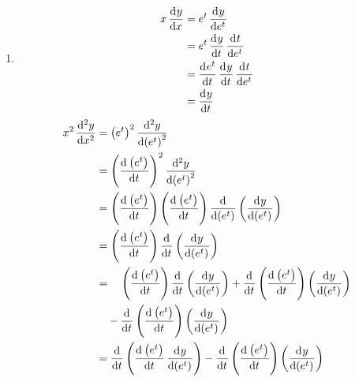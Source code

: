 \documentclass[fleqn, a4paper, 11pt, oneside]{amsart}
\theoremstyle{definition}
\theoremstyle{theorem}
\begin{document}
\begin{solution}
	\begin{enumerate}
		\item
			\begin{align*}
				x \dod{y}{x} & = e^t \dod{y}{{e^t}}                       \\
                                             & = e^t \dod{y}{t} \dod{t}{{e^t}}            \\
                                             & = \dod{{e^t}}{t} \dod{y}{t} \dod{t}{{e^t}} \\
                                             & = \dod{y}{t}
			\end{align*}
			\begin{align*}
				x^2 \dod[2]{y}{x} & = \left( e^t \right)^2 \dod[2]{y}{\left( e^t \right)}                                                                                                                                                   \\
                                                  & = \left( \dod{\left( e^t \right)}{t} \right)^2 \dod[2]{y}{\left( e^t \right)}                                                                                                                           \\
                                                  & = \left( \dod{\left( e^t \right)}{t} \right) \left( \dod{\left( e^t \right)}{t} \right) \dod{}{\left( e^t \right)}\left( \dod{y}{\left( e^t \right)} \right)                                            \\
                                                  & = \left( \dod{\left( e^t \right)}{t} \right) \dod{}{t}\left( \dod{y}{\left( e^t \right)} \right)                                                                                                        \\
                                                  & = \quad \left( \dod{\left( e^t \right)}{t} \right) \dod{}{t}\left( \dod{y}{\left( e^t \right)} \right) + \dod{}{t}\left( \dod{\left( e^t \right)}{t} \right) \left( \dod{y}{\left( e^t \right)} \right) \\
                                                  & \quad - \dod{}{t}\left( \dod{\left( e^t \right)}{t} \right) \left( \dod{y}{\left( e^t \right)} \right)                                                                                                  \\
                                                  & = \dod{}{t}\left( \dod{\left( e^t \right)}{t} \dod{y}{\left( e^t \right)} \right) - \dod{}{t}\left( \dod{\left( e^t \right)}{t} \right) \left( \dod{y}{\left( e^t \right)} \right)                      \\

\end{align*}
\end{enumerate}
\end{solution}
\end{document}
